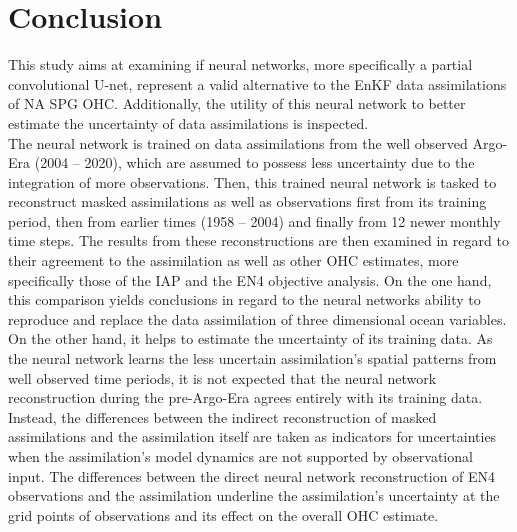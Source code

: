 \documentclass[Masterarbeit.tex]{subfile}
\begin{document}
	
	\chapter{Conclusion} \label{conclusions}
	
	This study aims at examining if neural networks, more specifically a partial convolutional U-net, represent a valid alternative to the EnKF data assimilations of NA SPG OHC. Additionally, the utility of this neural network to better estimate the uncertainty of data assimilations is inspected.\\
	The neural network is trained on data assimilations from the well observed Argo-Era (2004 -- 2020), which are assumed to possess less uncertainty due to the integration of more observations. Then, this trained neural network is tasked to reconstruct masked assimilations as well as observations first from its training period, then from earlier times (1958 -- 2004) and finally from 12 newer monthly time steps. The results from these reconstructions are then examined in regard to their agreement to the assimilation as well as other OHC estimates, more specifically those of the IAP and the EN4 objective analysis. On the one hand, this comparison yields conclusions in regard to the neural networks ability to reproduce and replace the data assimilation of three dimensional ocean variables. On the other hand, it helps to estimate the uncertainty of its training data. As the neural network learns the less uncertain assimilation's spatial patterns from well observed time periods, it is not expected that the neural network reconstruction during the pre-Argo-Era agrees entirely with its training data. Instead, the differences between the indirect reconstruction of masked assimilations and the assimilation itself are taken as indicators for uncertainties when the assimilation's model dynamics are not supported by observational input. The differences between the direct neural network  reconstruction of  EN4 observations and the assimilation underline the assimilation's uncertainty at the grid points of observations and its effect on the overall OHC estimate. \\
	
\end{document}
